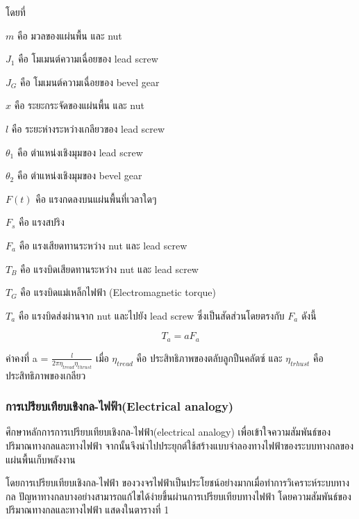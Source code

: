 \documentclass[11pt,a4paper]{article}
\begin{document}
โดยที่

$m$ คือ มวลของแผ่นพื้น และ nut

$J_{1}$ คือ โมเมนต์ความเฉื่อยของ lead screw

$J_{G}$ คือ โมเมนต์ความเฉื่อยของ bevel gear

$x$ คือ ระยะกระจัดของแผ่นพื้น และ nut

$l$ คือ ระยะห่างระหว่างเกลียวของ lead screw

$\theta_{1}$  คือ ตำแหน่งเชิงมุมของ lead screw

$\theta_{2}$  คือ ตำแหน่งเชิงมุมของ bevel gear

$F(t)$  คือ แรงกดลงบนแผ่นพื้นที่เวลาใดๆ

$F_{s}$   คือ แรงสปริง

$F_{a}$   คือ แรงเสียดทานระหว่าง nut และ lead screw

$T_{B}$   คือ แรงบิดเสียดทานระหว่าง nut และ lead screw

$T_{G}$   คือ แรงบิดแม่เหล็กไฟฟ้า (Electromagnetic torque)

$T_{a}$   คือ แรงบิดส่งผ่านจาก nut และไปยัง lead screw ซึ่งเป็นสัดส่วนโดยตรงกับ $F_{a}$ ดังนี้

\begin{equation}
    T_{a} = aF_{a}
\end{equation}

ค่าคงที่ a = $\frac{l}{2\pi \eta_{tread} \eta_{thrust}}$ เมื่อ $\eta_{tread}$ คือ ประสิทธิภาพของตลับลูกปืนคลัตซ์ และ $\eta_{trhust}$ คือ ประสิทธิภาพของเกลียว

\subsubsection{การเปรียบเทียบเชิงกล-ไฟฟ้า(Electrical analogy)}
ศึกษาหลักการการเปรียบเทียบเชิงกล-ไฟฟ้า(electrical analogy) \cite{ElecDrive} เพื่อเข้าใจความสัมพันธ์ของปริมาณทางกลและทางไฟฟ้า จากนั้นจึงนำไปประยุกต์ใช้สร้างแบบจำลองทางไฟฟ้าของระบบทางกลของแผ่นพื้นเก็บพลังงาน

โดยการเปรียบเทียบเชิงกล-ไฟฟ้า ของวงจรไฟฟ้าเป็นประโยชน์อย่างมากเมื่อทำการวิเคราะห์ระบบทางกล ปัญหาทางกลบางอย่างสามารถแก้ไขได้ง่ายขึ้นผ่านการเปรียบเทียบทางไฟฟ้า โดยความสัมพันธ์ของปริมาณทางกลและทางไฟฟ้า แสดงในตารางที่ 1

\newpage
\end{document}
